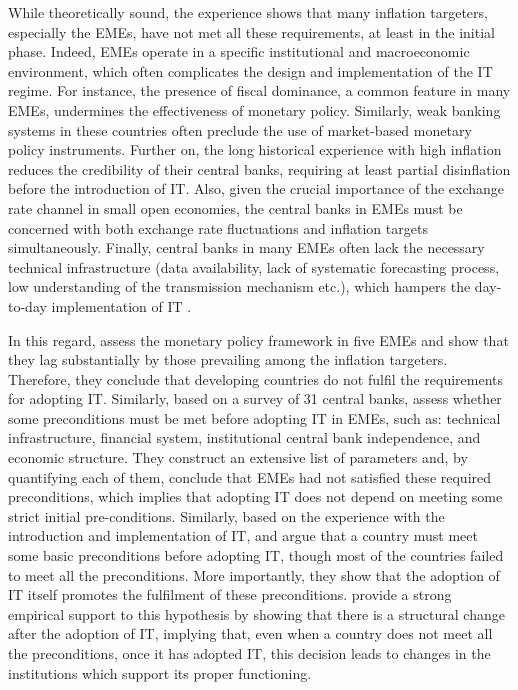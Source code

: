 \documentclass{article}
\begin{document}
While theoretically sound, the experience shows that many inflation targeters, especially the EMEs, have not met all these requirements, at least in the initial phase. Indeed, EMEs operate in a specific institutional and macroeconomic environment, which often complicates the design and implementation of the IT regime. For instance, the presence of fiscal dominance, a common feature in many EMEs, undermines the effectiveness of monetary policy. Similarly, weak banking systems in these countries often preclude the use of market-based monetary policy instruments. Further on, the long historical experience with high inflation reduces the credibility of their central banks, requiring at least partial disinflation before the introduction of IT. Also, given the crucial importance of the exchange rate channel in small open economies, the central banks in EMEs must be concerned with both exchange rate fluctuations and inflation targets simultaneously. Finally, central banks in many EMEs often lack the necessary technical infrastructure (data availability, lack of systematic forecasting process, low understanding of the transmission mechanism etc.), which hampers the day-to-day implementation of IT \citep{Amato2002, Jonas2007, Masson1997, Mishkin2000, Mishkin2004, Mishkin2002}.

In this regard, \citet{masson1997} assess the monetary policy framework in five EMEs and show that they lag substantially by those prevailing among the inflation targeters. Therefore, they conclude that developing countries do not fulfil the requirements for adopting IT. Similarly, based on a survey of 31 central banks, \citet{batini2007} assess whether some preconditions must be met before adopting IT in EMEs, such as: technical infrastructure, financial system, institutional central bank independence, and economic structure. They construct an extensive list of parameters and, by quantifying each of them, conclude that EMEs had not satisfied these required preconditions, which implies that adopting IT does not depend on meeting some strict initial pre-conditions. Similarly, based on the experience with the introduction and implementation of IT, \citet{freedman2009} and \citet{schmidt-hebbel2016} argue that a country must meet some basic preconditions before adopting IT, though most of the countries failed to meet all the preconditions. More importantly, they show that the adoption of IT itself promotes the fulfilment of these preconditions. \citet{samarina2014} provide a strong empirical support to this hypothesis by showing that there is a structural change after the adoption of IT, implying that, even when a country does not meet all the preconditions, once it has adopted IT, this decision leads to changes in the institutions which support its proper functioning.
\end{document}
